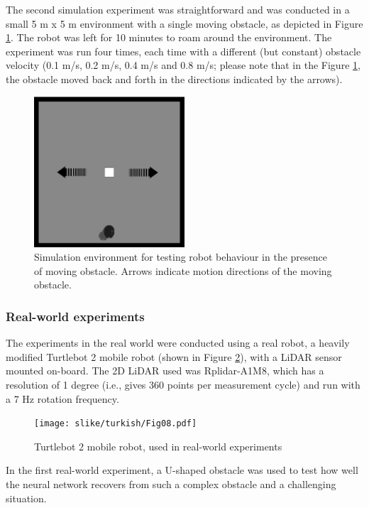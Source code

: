 The second simulation experiment was straightforward and was conducted in a small 5 m x 5 m environment with a single moving obstacle, as depicted in Figure \ref{fig:Fig07}. The robot was left for 10 minutes to roam around the environment. The experiment was run four times, each time with a different (but constant) obstacle velocity (0.1 m/s, 0.2 m/s, 0.4 m/s and 0.8 m/s; please note that in the Figure \ref{fig:Fig07}, the obstacle moved back and forth in the directions indicated by the arrows). 

\begin{figure}
    \centering
    \includegraphics[width=0.5\textwidth]{slike/turkish/Fig07.png}
    \caption{Simulation environment for testing robot behaviour in the presence of moving obstacle. Arrows indicate motion directions of the moving obstacle.}
    \label{fig:Fig07}
\end{figure}

\subsubsection{Real-world experiments}

The experiments in the real world were conducted using a real robot, a heavily modified Turtlebot 2 mobile robot (shown in Figure \ref{fig:Fig08}), with a LiDAR sensor mounted on-board. The 2D LiDAR used was Rplidar-A1M8, which has a resolution of 1 degree (i.e., gives 360 points per measurement cycle) and run with a 7 Hz rotation frequency. 

\begin{figure}
    \centering
    \texttt{[image: slike/turkish/Fig08.pdf]}
    \caption{Turtlebot 2 mobile robot, used in real-world experiments}
    \label{fig:Fig08}
\end{figure}

In the first real-world experiment, a U-shaped obstacle was used to test how well the neural network recovers from such a complex obstacle and a challenging situation. 

